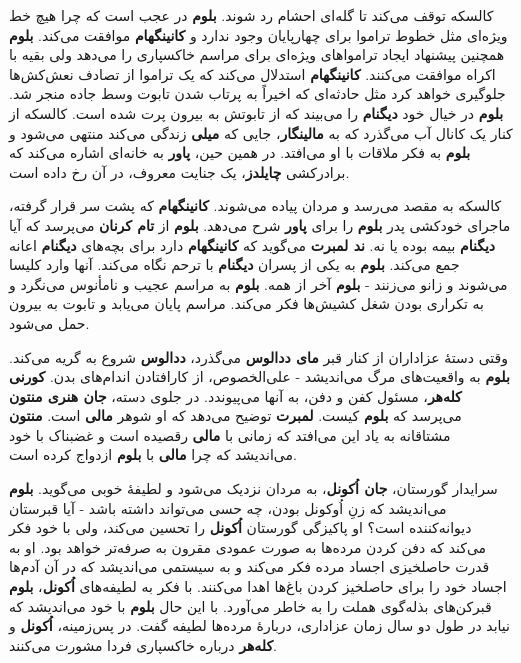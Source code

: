 \documentclass[12pt]{book}
\newcommand{\noun}[1]{{\textbf{#1}}}
\begin{document}
    کالسکه توقف می‌کند تا گله‌ای احشام رد شوند. \noun{بلوم} در عجب است که چرا هیچ خط ویژه‌ای مثل خطوط تراموا برای چهارپایان وجود ندارد و \noun{کانینگهام} موافقت می‌کند. \noun{بلوم} همچنین پیشنهاد ایجاد ترامواهای ویژه‌ای برای مراسم خاکسپاری را می‌دهد ولی بقیه با اکراه موافقت می‌کنند. \noun{کانینگهام} استدلال می‌کند که یک تراموا از تصادف نعش‌کش‌ها جلوگیری خواهد کرد مثل حادثه‌ای که اخیراً به پرتاب شدن تابوت وسط جاده منجر شد. \noun{بلوم} در خیال خود \noun{دیگنام} را می‌بیند که از تابوتش به بیرون پرت شده است. کالسکه از کنار یک کانال آب می‌گذرد که به \noun{مالینگار}، جایی که \noun{میلی} زندگی می‌کند منتهی می‌شود و \noun{بلوم} به فکر ملاقات با او می‌افتد. در همین حین، \noun{پاور} به خانه‌ای اشاره می‌کند که برادرکشی \noun{چایلدز}، یک جنایت معروف، در آن رخ داده است.

    کالسکه به مقصد می‌رسد و مردان پیاده می‌شوند. \noun{کانینگهام} که پشت سر قرار گرفته، ماجرای خودکشی پدر \noun{بلوم} را برای \noun{پاور} شرح می‌دهد. \noun{بلوم} از \noun{تام کرنان} می‌پرسد که آیا \noun{دیگنام} بیمه بوده یا نه. \noun{ند لمبرت} می‌گوید که \noun{کانینگهام} دارد برای بچه‌های \noun{دیگنام} اعانه جمع می‌کند. \noun{بلوم} به یکی از پسران \noun{دیگنام} با ترحم نگاه می‌کند. آنها وارد کلیسا می‌شوند و زانو می‌زنند - \noun{بلوم} آخر از همه. \noun{بلوم} به مراسم عجیب و نامأنوس می‌نگرد و به تکراری بودن شغل کشیش‌ها فکر می‌کند. مراسم پایان می‌یابد و تابوت به بیرون حمل می‌شود.

    وقتی دستهٔ عزاداران از کنار قبر \noun{مای ددالوس} می‌گذرد، \noun{ددالوس} شروع به گریه می‌کند. \noun{بلوم} به واقعیت‌های مرگ می‌اندیشد - علی‌الخصوص، از کارافتادن اندام‌های بدن. \noun{کورنی کله‌هر}، مسئول کفن و دفن، به آنها می‌پیوندد. در جلوی دسته، \noun{جان هنری منتون} می‌پرسد که \noun{بلوم} کیست. \noun{لمبرت} توضیح می‌دهد که او شوهر \noun{مالی} است. \noun{منتون} مشتاقانه به یاد این می‌افتد که زمانی با \noun{مالی} رقصیده است و غضبناک با خود می‌اندیشد که چرا \noun{مالی} با \noun{بلوم} ازدواج کرده است.

    سرایدار گورستان، \noun{جان اُکونل}، به مردان نزدیک می‌شود و لطیفهٔ خوبی می‌گوید. \noun{بلوم} می‌اندیشد که زنِ اُوکونل بودن، چه حسی می‌تواند داشته باشد - آیا قبرستان دیوانه‌کننده است؟ او پاکیزگی گورستان \noun{اُکونل} را تحسین می‌کند، ولی با خود فکر می‌کند که دفن کردن مرده‌ها به صورت عمودی مقرون به صرفه‌تر خواهد بود. او به قدرت حاصلخیزی اجساد مرده فکر می‌کند و به سیستمی می‌اندیشد که در آن آدم‌ها اجساد خود را برای حاصلخیز کردن باغ‌ها اهدا می‌کنند. با فکر به لطیفه‌های \noun{اُکونل}، \noun{بلوم} قبرکن‌های بذله‌گوی هملت را به خاطر می‌آورد. با این حال \noun{بلوم} با خود می‌اندیشد که نیابد در طول دو سال زمان عزاداری، دربارهٔ مرده‌ها لطیفه گفت. در پس‌زمینه، \noun{اُکونل} و \noun{کله‌هر} درباره خاکسپاری فردا مشورت می‌کنند.
\end{document}
